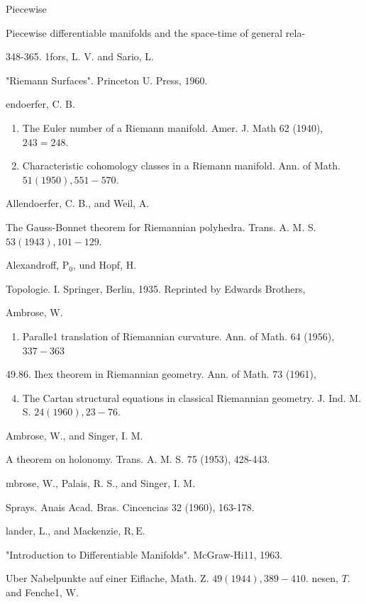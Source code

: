 \documentclass[10pt]{article}
\begin{document}
Piecewise

Piecewise differentiable manifolds and the space-time of general rela-

348-365. 1fors, L. V. and Sario, L.

"Riemann Surfaces". Princeton U. Press, $1960 .$

endoerfer, C. B.

\begin{enumerate}
  \item The Euler number of a Riemann manifold. Amer. J. Math 62 (1940), $243=248 .$

  \item Characteristic cohomology classes in a Riemann manifold. Ann. of Math. $51(1950), 551-570$.

\end{enumerate}
Allendoerfer, C. B., and Weil, A.

The Gauss-Bonnet theorem for Riemannian polyhedra. Trans. A. M. S. $53(1943), 101-129 .$

Alexandroff, $\mathrm{P}_{0}$, und Hopf, $\mathrm{H}$.

Topologie. I. Springer, Berlin, 1935. Reprinted by Edwards Brothers,

Ambrose, W.

\begin{enumerate}
  \item Paralle1 translation of Riemannian curvature. Ann. of Math. 64 (1956), $337-363$
\end{enumerate}
49.86. Ihex theorem in Riemannian geometry. Ann. of Math. 73 (1961),

\begin{enumerate}
  \setcounter{enumi}{3}
  \item The Cartan structural equations in classical Riemannian geometry. J. Ind. M. S. $24(1960), 23-76 .$
\end{enumerate}
Ambrose, W., and Singer, I. M.

A theorem on holonomy. Trans. A. M. S. 75 (1953), 428-443.

mbrose, W., Palais, R. S., and Singer, I. M.

Sprays. Anais Acad. Bras. Cincencias 32 (1960), 163-178.

lander, L., and Mackenzie, $\mathrm{R}, \mathrm{E}$.

"Introduction to Differentiable Manifolds". McGraw-Hi11, 1963.

Uber Nabelpunkte auf einer Eiflache, Math. Z. $49(1944), 389-410 .$ nesen, $T$. and Fenche1, W.
\end{document}
